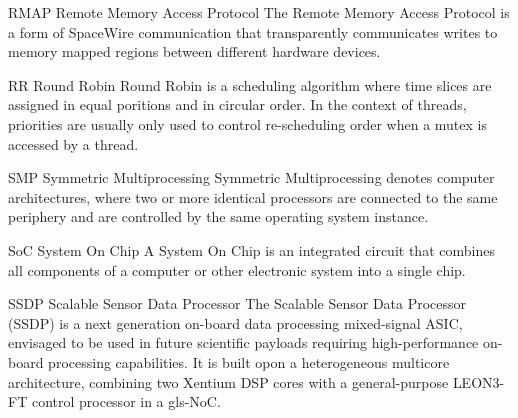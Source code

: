 %
  {RMAP}%
  {Remote Memory Access Protocol}%
  {The Remote Memory Access Protocol is a form of \gls{SpaceWire} communication
   that transparently communicates writes to memory mapped regions between
   different hardware devices.}%


%
  {RR}%
  {Round Robin}%
  {Round Robin is a scheduling algorithm where time slices are assigned in equal
   poritions and in circular order. In the context of threads, priorities are
   usually only used to control re-scheduling order when a mutex is accessed by
   a thread.}%


%
  {SMP}%
  {Symmetric Multiprocessing}%
  {Symmetric Multiprocessing denotes computer architectures, where two or more
   identical processors are connected to the same periphery and are controlled
   by the same operating system instance.}%

%
  {SoC}%
  {System On Chip}%
  {A System On Chip is an integrated circuit that combines all components of a %
   computer or other electronic system into a single chip.}%



  {SSDP}            %
  {Scalable Sensor Data Processor}  %
  {The Scalable Sensor Data Processor (SSDP) is a next generation on-board %
   data processing mixed-signal ASIC, envisaged to be used in future scientific %
   payloads requiring high-performance on-board processing capabilities. %
   It is built opon a heterogeneous multicore architecture, combining two %
   \gls{Xentium} \gls{DSP} cores with a general-purpose \gls{LEON3-FT} control %
   processor in a \gls{gls-NoC}.} %


